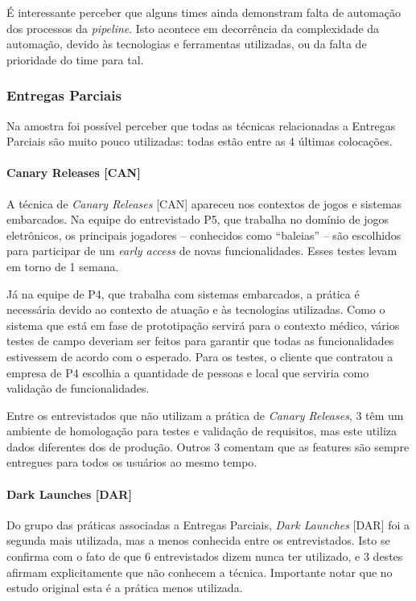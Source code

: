 É interessante perceber que alguns times ainda demonstram falta de automação dos processos da \emph{pipeline}. Isto acontece em decorrência da complexidade da automação, devido às tecnologias e ferramentas utilizadas, ou da falta de prioridade do time para tal.
 
\subsubsection{Entregas Parciais}

Na amostra foi possível perceber que todas as técnicas relacionadas a Entregas Parciais são muito pouco utilizadas: todas estão entre as 4 últimas colocações.

\paragraph*{Canary Releases [CAN]}

A técnica de \emph{Canary Releases} [CAN] \cite{continuousDeliveryBook} apareceu nos contextos de jogos e sistemas embarcados. Na equipe do entrevistado P5, que trabalha no domínio de jogos eletrônicos, os principais jogadores -- conhecidos como ``baleias'' -- são escolhidos para participar de um \emph{early access} de novas funcionalidades.  Esses testes levam em torno de 1 semana. 

Já na equipe de P4, que trabalha com sistemas embarcados, a prática é necessária devido ao contexto de atuação e às tecnologias utilizadas. Como o sistema que está em fase de prototipação servirá para o contexto médico, vários testes de campo deveriam ser feitos para garantir que todas as funcionalidades estivessem de acordo com o esperado. Para os testes, o cliente que contratou a empresa de P4 escolhia a quantidade de pessoas e local que serviria como validação de funcionalidades.

Entre os entrevistados que não utilizam a prática de \emph{Canary Releases}, 3 têm um ambiente de homologação para testes e validação de requisitos, mas este utiliza dados diferentes dos de produção. Outros 3 comentam que as features são sempre entregues para todos os usuários ao mesmo tempo.


\paragraph*{Dark Launches [DAR]}

Do grupo das práticas associadas a Entregas Parciais, \emph{Dark Launches} [DAR] \cite{devAndDeploymentFB} foi a segunda mais utilizada, mas a menos conhecida entre os entrevistados. Isto se confirma com o fato de que 6 entrevistados dizem nunca ter utilizado, e 3 destes afirmam explicitamente que não conhecem a técnica. Importante notar que no estudo original \cite{empiricalStudy2016} esta é a prática menos utilizada.

